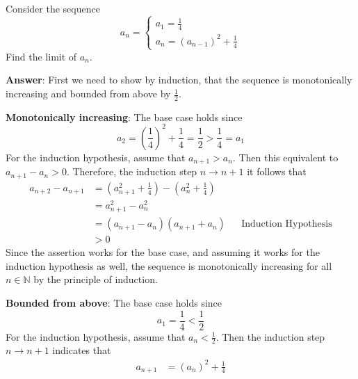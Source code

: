 \begin{exm}\label{exm-sequence-limit:2}
	Consider the sequence
	\begin{equation*}
		a_n=\begin{cases}
			a_1=\frac{1}{4} \\
			a_n=(a_{n-1})^2+\frac{1}{4}
		\end{cases}
	\end{equation*}
	Find the limit of $a_n$.
	\begin{flushleft}
		\textbf{Answer}:
		First we need to show by induction, that the sequence is monotonically increasing
		and bounded from above by $\tfrac{1}{2}$.
		\begin{flushleft}
			\textbf{Monotonically increasing}: The base case holds since
			\begin{equation*}
				a_2 = \left(\frac{1}{4}\right)^2+\frac{1}{4} = \frac{1}{2} > \frac{1}{4} = a_1
			\end{equation*}
			For the induction hypothesis, assume that $a_{n+1}>a_{n}$. Then this equivalent
			to $a_{n+1}-a_n>0$. Therefore, the induction step $n \to n+1$ it follows that
			\begin{align*}
				a_{n+2}-a_{n+1} & = \left(a_{n+1}^2+\frac{1}{4}\right) - \left(a_n^2+\frac{1}{4}\right)                                  \\
				                & = a_{n+1}^2 - a_n^2                                                                                    \\
				                & = (a_{n+1} - a_n)(a_{n+1} + a_n)                                      &  & \text{Induction Hypothesis} \\
				                & >0
			\end{align*}
			Since the assertion works for the base case, and assuming it works for the
			induction hypothesis as well, the sequence is monotonically increasing for all $n\in\mathbb{N}$
			by the principle of induction.
		\end{flushleft}
		\begin{flushleft}
			\textbf{Bounded from above}: The base case holds since
			\begin{equation*}
				a_1 = \frac{1}{4} < \frac{1}{2}
			\end{equation*}
			For the induction hypothesis, assume that $a_{n}<\tfrac{1}{2}$. Then
			the induction step $n \to n+1$ indicates that
			\begin{align*}
				a_{n+1} & = (a_n)^2 + \frac{1}{4}                                                     \\

\end{align*}
\end{flushleft}
\end{flushleft}
\end{exm}
